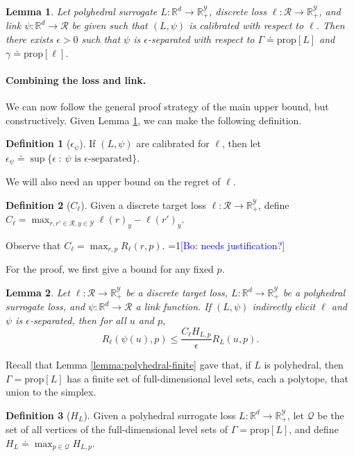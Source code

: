 \documentclass{article}
\newtheorem{lemma}{Lemma}
\theoremstyle{definition}\newtheorem{definition}{Definition}
\theoremstyle{definition}\newtheorem{assumption}{Assumption}
\newcommand{\Comments}{0}
\newcommand{\mynote}[2]{\ifnum\Comments=1\textcolor{#1}{#2}\fi}
\newcommand{\bo}[1]{\mynote{blue}{[Bo: #1]}}
\newcommand{\reals}{\mathbb{R}}
\newcommand{\defeq}{\doteq}%
\newcommand{\prop}[1]{\mathrm{prop}[#1]}
\newcommand{\R}{\mathcal{R}}
\newcommand{\Y}{\mathcal{Y}}
\begin{document}
\begin{lemma}\label{lemma:calibrated-eps-sep}
  Let polyhedral surrogate $L:\reals^d \to \reals^\Y_+$, discrete loss $\ell:\R\to\reals^\Y_+$, and link $\psi:\reals^d\to\R$ be given such that $(L,\psi)$ is calibrated with respect to $\ell$.
  Then there exists $\epsilon>0$ such that $\psi$ is $\epsilon$-separated with respect to   $\Gamma \defeq \prop{L}$ and $\gamma \defeq \prop{\ell}$.
\end{lemma}


\paragraph{Combining the loss and link.}
We can now follow the general proof strategy of the main upper bound, but constructively.
Given Lemma \ref{lemma:calibrated-eps-sep}, we can make the following definition.
\begin{definition}[$\epsilon_{\psi}$]
  If $(L,\psi)$ are calibrated for $\ell$, then let $\epsilon_{\psi} \defeq \sup \{ \epsilon ~:~ \text{$\psi$ is $\epsilon$-separated}\}$.
\end{definition}
We will also need an upper bound on the regret of $\ell$.
\begin{definition}[$C_{\ell}$]
  Given a discrete target loss $\ell: \R \to \reals_+^{\Y}$, define $C_{\ell} = \max_{r,r' \in \R, y \in \Y} \ell(r)_y - \ell(r')_y$.
\end{definition}
Observe that $C_{\ell} = \max_{r,p} R_{\ell}(r,p)$.
\bo{needs justification?}

For the proof, we first give a bound for any fixed $p$.
\begin{lemma} \label{lemma:separated-constant-p}
  Let $\ell: \R \to \reals_+^{\Y}$ be a discrete target loss, $L: \reals^d \to \reals_+^{\Y}$ be a polyhedral surrogate loss, and $\psi: \reals^d \to \R$ a link function.
  If $(L,\psi)$ indirectly elicit $\ell$ and $\psi$ is $\epsilon$-separated, then for all $u$ and $p$,
    \[ R_{\ell}(\psi(u),p) \leq \frac{C_{\ell} H_{L,p}}{\epsilon} R_L(u,p) . \]
\end{lemma}

Recall that Lemma \ref{lemma:polyhedral-finite} gave that, if $L$ is polyhedral, then $\Gamma = \prop{L}$ has a finite set of full-dimensional level sets, each a polytope, that union to the simplex.
\begin{definition}[$H_L$]
  Given a polyhedral surrogate loss $L: \reals^d \to \reals_+^{\Y}$, let $\mathcal{Q}$ be the set of all vertices of the full-dimensional level sets of $\Gamma = \prop{L}$, and define $H_L \defeq \max_{p \in \mathcal{Q}} H_{L,p}$.
\end{definition}
\end{document}
